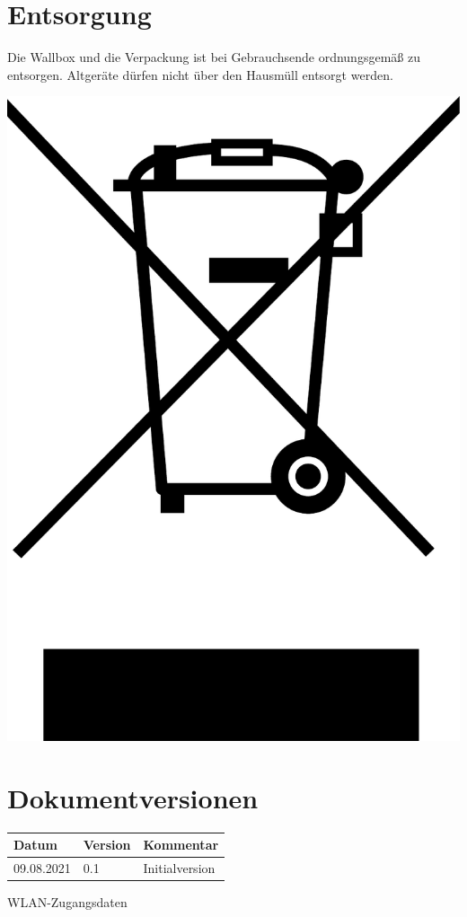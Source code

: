 \documentclass[a4paper,10pt]{article}
\begin{document}
\begin{multicols*}{2}
	\section{Entsorgung}
	\begin{minipage}{0.35\textwidth}
		Die Wallbox und die Verpackung ist bei Gebrauchsende ordnungsgemäß zu
		entsorgen. Altgeräte dürfen nicht über den Hausmüll entsorgt werden.
	\end{minipage}\hfill
	\begin{minipage}{0.1\textwidth}
		\includegraphics[width=\linewidth]{./img_warp2/resized/weee.pdf}
	\end{minipage}

	\section{Dokumentversionen}
	\begin{tabular}{lll}
		\toprule
		Datum      & Version & Kommentar                   \\
		\midrule
		09.08.2021 & 0.1     & Initialversion              \\
		\bottomrule
	\end{tabular}
	\newpage
	\pagestyle{empty}
	\null
	\vfill
	WLAN-Zugangsdaten
	\begin{tcolorbox}[width=4.2cm,height=2.7cm, boxrule=0.25mm]


\end{tcolorbox}
\end{multicols*}
\end{document}
